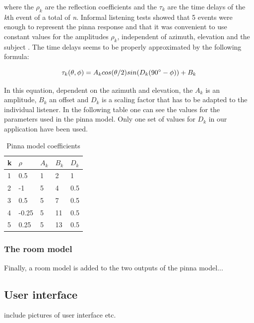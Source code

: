 \documentclass[journal]{IEEEtran}
\begin{document}
where the $\rho_{k}$ are the reflection coefficients and the $\tau_{k}$ are the time delays of the \textit{k}th event of a total of \textit{n}. Informal listening tests showed that 5 events were enough to represent the pinna response and that it was convenient to use constant values for the amplitudes $\rho_{k}$,  independent of azimuth, elevation and the subject \cite{Brown1997}. The time delays seems to be properly approximated by the following formula:

\begin{equation}\label{eq:pinna}
\tau_{k}(\theta,\phi) = A_{k}cos(\theta/2)sin(D_{k}(90\degree - \phi)) + B_{k}
\end{equation} 

In this equation, dependent on the azimuth and elevation, the $A_{k}$ is an amplitude, $B_{k}$ an offset and $D_{k}$ is a scaling factor that has to be adapted to the individual listener. 
In the following table one can see the values for the parameters used in the pinna model. Only one set of values for $D_{k}$ in our application have been used.

\begin{table}[h]
\centering
\caption{Pinna model coefficients}
\label{PinnaModel parameters}
\begin{tabular}{|l|l|l|l|l|}
\hline
k & $\rho$  & $A_{k}$ & $B_{k}$  & $D_{k}$   \\ \hline
1 & 0.5   & 1 & 2  & 1   \\ \hline
2 & -1    & 5 & 4  & 0.5 \\ \hline
3 & 0.5   & 5 & 7  & 0.5 \\ \hline
4 & -0.25 & 5 & 11 & 0.5 \\ \hline
5 & 0.25  & 5 & 13 & 0.5 \\ \hline
\end{tabular}
\end{table}


\subsubsection{The room model}

Finally, a room model is added to the two outputs of the pinna model...





\subsection{User interface}
include pictures of user interface etc.
\end{document}
